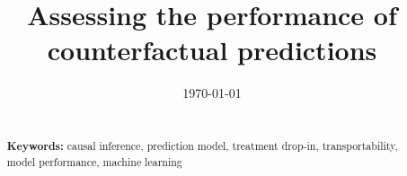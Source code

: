 \documentclass[12pt]{article}
\begin{document}
\begin{titlepage}
\title{Assessing the performance of counterfactual predictions} %
\author{}
\date{\today}
\maketitle

\begin{abstract}
\noindent 
\vspace{0in} \\
\noindent\textbf{Keywords:} causal inference, prediction model, treatment drop-in, transportability, model performance, machine learning \\

\bigskip
\end{abstract}
\setcounter{page}{0}
\thispagestyle{empty}
\end{titlepage}
\pagebreak \newpage

\doublespacing



\clearpage

\printbibliography

\clearpage

\begin{appendix}
    \renewcommand{\thefigure}{A\arabic{figure}}
    \setcounter{figure}{0}
    
    \renewcommand{\thetable}{A\arabic{table}}
    \setcounter{table}{0}
    
    \renewcommand{\theequation}{A\arabic{equation}}
    \setcounter{equation}{0}

    \renewcommand{\thesection}{\Alph{section}}

    \newpage

    
\end{appendix}

\onehalfspacing
\end{document}

